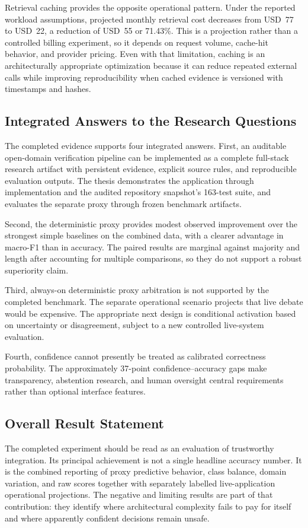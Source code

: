 \documentclass[12pt,a4paper,openany]{report}
\begin{document}
Retrieval caching provides the opposite operational pattern. Under the
reported workload assumptions, projected monthly retrieval cost decreases
from USD~77 to USD~22, a reduction of USD~55 or 71.43\%. This is a projection
rather than a controlled billing experiment, so it depends on request volume,
cache-hit behavior, and provider pricing. Even with that limitation, caching
is an architecturally appropriate optimization because it can reduce
repeated external calls while improving reproducibility when cached evidence
is versioned with timestamps and hashes.

\subsection{Integrated Answers to the Research Questions}
The completed evidence supports four integrated answers. First, an auditable
open-domain verification pipeline can be implemented as a complete
full-stack research artifact with persistent evidence, explicit source rules,
and reproducible evaluation outputs. The thesis demonstrates the application
through implementation and the audited repository snapshot's 163-test suite, and evaluates the separate
proxy through frozen benchmark artifacts.

Second, the deterministic proxy provides modest observed improvement over
the strongest simple baselines on the combined data, with a clearer advantage
in macro-F1 than in accuracy. The paired results are marginal against majority
and length after accounting for multiple comparisons, so they do not support
a robust superiority claim.

Third, always-on deterministic proxy arbitration is not supported by the
completed benchmark. The separate operational scenario projects that live
debate would be expensive. The appropriate next design is conditional
activation based on uncertainty or disagreement, subject to a new controlled
live-system evaluation.

Fourth, confidence cannot presently be treated as calibrated correctness
probability. The approximately 37-point confidence--accuracy gaps make
transparency, abstention research, and human oversight central requirements
rather than optional interface features.

\subsection{Overall Result Statement}
The completed experiment should be read as an evaluation of trustworthy
integration. Its principal achievement is not a single headline accuracy
number. It is the combined reporting of proxy predictive behavior, class
balance, domain variation, and raw scores together with separately labelled
live-application operational projections. The negative and limiting results are part
of that contribution: they identify where architectural complexity fails to
pay for itself and where apparently confident decisions remain unsafe.
\end{document}
